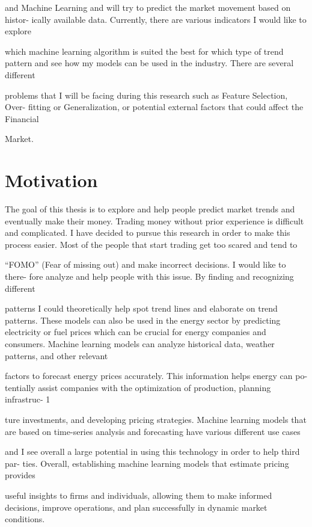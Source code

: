 \documentclass{imc-inf}
\begin{document}
and Machine Learning and will try to predict the market movement based on histor-
ically available data. Currently, there are various indicators I would like to explore

which machine learning algorithm is suited the best for which type of trend pattern
and see how my models can be used in the industry. There are several different

problems that I will be facing during this research such as Feature Selection, Over-
fitting or Generalization, or potential external factors that could affect the Financial

Market.

\section*{Motivation}
The goal of this thesis is to explore and help people predict market trends and
eventually make their money. Trading money without prior experience is difficult
and complicated. I have decided to pursue this research in order to make this
process easier. Most of the people that start trading get too scared and tend to

“FOMO” (Fear of missing out) and make incorrect decisions. I would like to there-
fore analyze and help people with this issue. By finding and recognizing different

patterns I could theoretically help spot trend lines and elaborate on trend patterns.
These models can also be used in the energy sector by predicting electricity or
fuel prices which can be crucial for energy companies and consumers. Machine
learning models can analyze historical data, weather patterns, and other relevant

factors to forecast energy prices accurately. This information helps energy can po-
tentially assist companies with the optimization of production, planning infrastruc-
1

ture investments, and developing pricing strategies. Machine learning models that
are based on time-series analysis and forecasting have various different use cases

and I see overall a large potential in using this technology in order to help third par-
ties. Overall, establishing machine learning models that estimate pricing provides

useful insights to firms and individuals, allowing them to make informed decisions,
improve operations, and plan successfully in dynamic market conditions.
\end{document}
